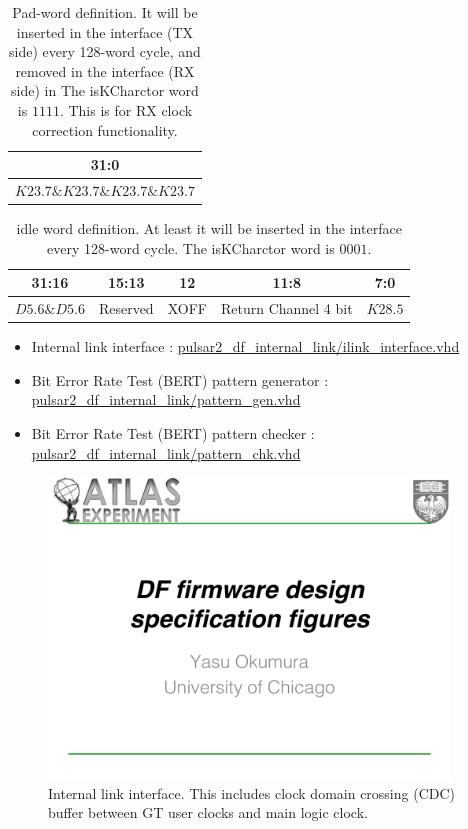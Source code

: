 \documentclass[11pt,letterpaper]{article}
\begin{document}
\begin{table}[h]
\begin{tabular}{|c|}
\hline
31:0   \\ \hline
$K23.7\&K23.7\&K23.7\&K23.7$ \\ \hline
\end{tabular}
\caption{Pad-word definition. It will be inserted in the interface (TX side) every 128-word cycle, and removed in the interface (RX side) in The isKCharctor word is $1111$. This is for RX clock correction functionality.}
\end{table}

\begin{table}[h]
\begin{tabular}{|c|c|c|c|c|}
\hline
31:16              & 15:13    & 12   & 11:8                 & 7:0   \\ \hline
$D5.6\&D5.6$ & Reserved & XOFF & Return Channel 4 bit & $K28.5$ \\ \hline
\end{tabular}
\caption{idle word definition. At least it will be inserted in the interface every 128-word cycle. The isKCharctor word is $0001$.}
\end{table}




\begin{itemize}
\item Internal link interface : \url{pulsar2_df_internal_link/ilink_interface.vhd}
\item Bit Error Rate Test (BERT) pattern generator : \url{pulsar2_df_internal_link/pattern_gen.vhd}
\item Bit Error Rate Test (BERT) pattern checker : \url{pulsar2_df_internal_link/pattern_chk.vhd}
\end{itemize}

\begin{figure}[h!]
  \centering
  \includegraphics[width=0.95\textwidth,clip,page=11]{figures.pdf}
  \caption{Internal link interface. This includes clock domain crossing (CDC) buffer between GT user clocks and main logic clock.}
  \label{fig:EVENT_INTERNALINK}
\end{figure}
\end{document}
